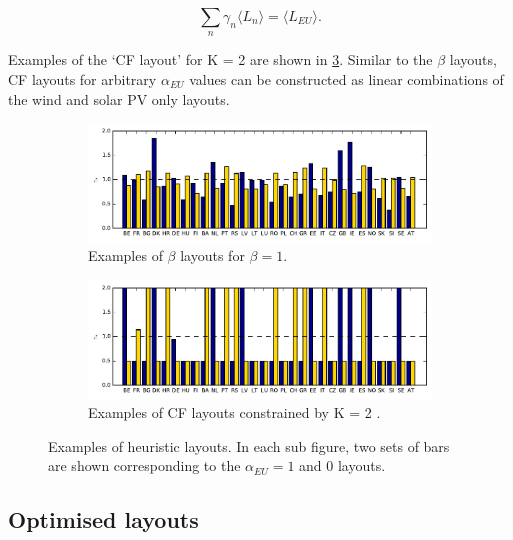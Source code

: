 \documentclass[a4paper, 5p, sort&compress]{elsarticle}%
\newcommand{\mean}[1]{\langle #1 \rangle}
\newcommand{\chromowidth}{1.00 \columnwidth}
\begin{document}
\begin{equation}
  \label{eq:norm}
  \sum_{n} \gamma_{n} \mean{L_{n}} = \mean{L_{EU}}.
\end{equation}

Examples of the `CF layout' for K = 2 are shown in
\cref{fig:examples}. Similar to the $\beta$ layouts, CF layouts for
arbitrary $\alpha_{EU}$ values can be constructed as linear combinations of the
wind and solar PV only layouts.

\begin{figure}[t!]
  \centering
  \begin{subfigure}{2\columnwidth}
    \includegraphics[width = \chromowidth, center]{beta=1}
    \caption{Examples of $\beta$ layouts for $\beta = 1$.}
    \label{fig:betaExamples}
  \end{subfigure}
  \begin{subfigure}{2\columnwidth}
    \includegraphics[width = \chromowidth, center]{k=2cfMax}
    \caption{Examples of CF layouts constrained by K = 2 .}
    \label{fig:cfMaxExamples}
  \end{subfigure}
  \caption{Examples of heuristic layouts. In each sub figure, two sets
    of bars are shown corresponding to the $\alpha_{EU} = 1$ and $0$
    layouts.}
  \label{fig:examples}
\end{figure}

\subsection{Optimised layouts}
\label{sec:optimized-layouts}
\end{document}
